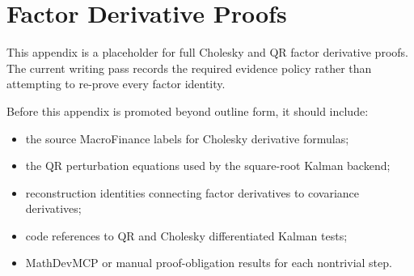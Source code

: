 \chapter{Factor Derivative Proofs}
\label{app:bf-factor-derivative-proofs}

This appendix is a placeholder for full Cholesky and QR factor derivative
proofs.  The current writing pass records the required evidence policy rather
than attempting to re-prove every factor identity.

Before this appendix is promoted beyond outline form, it should include:
\begin{itemize}
  \item the source MacroFinance labels for Cholesky derivative formulas;
  \item the QR perturbation equations used by the square-root Kalman backend;
  \item reconstruction identities connecting factor derivatives to covariance
    derivatives;
  \item code references to QR and Cholesky differentiated Kalman tests;
  \item MathDevMCP or manual proof-obligation results for each nontrivial step.
\end{itemize}
